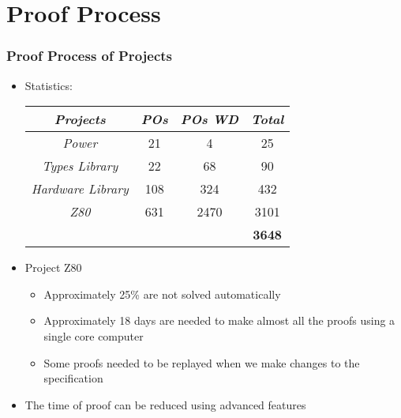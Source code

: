 \section{Proof Process}

\begin{frame}
\frametitle{Proof Process of Projects}

\begin{itemize}
   \item Statistics:\\
    \begin{center}{\footnotesize
  	 \begin{tabular}{|c|c|c|c|}
		\hline
		 \textsl{Projects} &  \textsl{POs}	& \textsl{POs WD} &	\textsl{Total}\\
		\hline
		\textit{Power} & 	21 &	4 &	25\\
		\hline
		\textit{Types Library} &	22 &	68 &	90\\
		\hline
		\textit{Hardware Library} &	108 &	324 &	432\\
		\hline
		\textit{Z80} &	631	 & 2470 & 	3101\\
		\hline
		   &    &  & 		\textbf{3648}\\
		\hline
	 \end{tabular}
   }
	\end{center}

   \item Project Z80
    \begin{itemize}
	    \item  Approximately 25\% are not solved automatically
		\item Approximately 18 days are needed to make almost all the proofs using a
		single core computer
		\item Some proofs needed to be replayed when we make changes to the specification
	\end{itemize}
	\item The time of proof can be reduced using advanced features
	
	
\end{itemize}

\end{frame}


